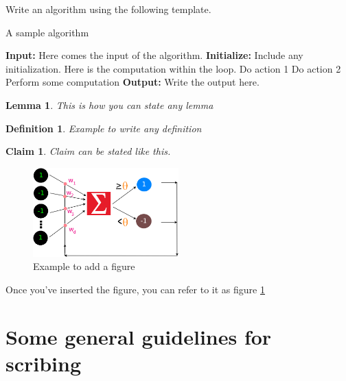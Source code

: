\documentclass[twosided]{article}
\newtheorem{lemma}[theorem]{Lemma}
\newtheorem{claim}[theorem]{Claim}
\newtheorem{definition}[theorem]{Definition}
\begin{document}
Write an algorithm using the following template. 

\begin{algorithm}[H]
	\caption{A sample algorithm}
	\begin{algorithmic}[1]
		\STATE \textbf{Input:} Here comes the input of the algorithm. 
		\STATE \textbf{Initialize:} Include any initialization. 
		\STATE Here is the computation within the loop. 
		\ENDFOR
		\STATE Do action 1
		\ELSE
		\STATE Do action 2 
		\ENDIF
		\STATE Perform some computation
		\ENDWHILE
		\STATE \textbf{Output:} Write the output here. 
	\end{algorithmic}
\end{algorithm}

\begin{lemma}
	This is how you can state any lemma
\end{lemma}


\begin{definition}
	Example to write any definition
\end{definition}

\begin{claim}
	Claim can be stated like this.
\end{claim}
\begin{figure}[!h]
	\centering
	\includegraphics[width=0.5\textwidth]{perceptron.png}
	\caption{Example to add a figure}
	\label{fig:perceptron}
\end{figure}

Once you've inserted the figure, you can refer to it as figure \ref{fig:perceptron}


\section{Some general guidelines for scribing}
\end{document}
